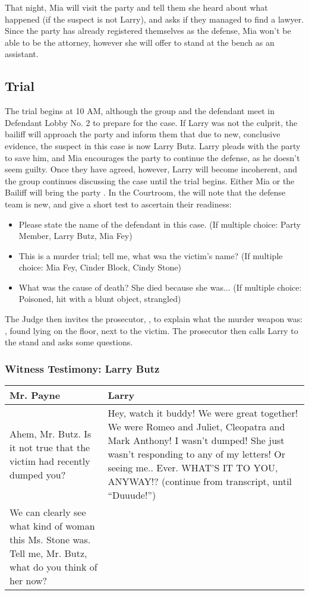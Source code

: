 That night, Mia will visit the party and tell them she heard about what happened (if the suspect is not Larry), and asks if they managed to find a lawyer. Since the party has already registered themselves as the defense, Mia won't be able to be the attorney, however she will offer to stand at the bench as an assistant. 

\subsection{Trial}
The trial begins at 10 AM, although the group and the defendant meet in Defendant Lobby No. 2 to prepare for the case. If Larry was not the culprit, the bailiff will approach the party and inform them that due to new, conclusive evidence, the suspect in this case is now Larry Butz. Larry pleads with the party to save him, and Mia encourages the party to continue the defense, as he doesn't seem guilty. Once they have agreed, however, Larry will become incoherent, and the group continues discussing the case until the trial begins. Either Mia or the Bailiff will bring the party . In the Courtroom, the  will note that the defense team is new, and give a short test to ascertain their readiness:
\begin{itemize}
\item Please state the name of the defendant in this case. (If multiple choice: Party Member, Larry Butz, Mia Fey)
\item This is a murder trial; tell me, what wsa the victim's name? (If multiple choice: Mia Fey, Cinder Block, Cindy Stone)
\item What was the cause of death? She died because she was... (If multiple choice: Poisoned, hit with a blunt object, strangled)
\end{itemize}

The Judge then invites the prosecutor, , to explain what the murder weapon was: , found lying on the floor, next to the victim. The prosecutor then calls Larry to the stand and asks some questions.

\subsubsection{Witness Testimony: Larry Butz}
\begin{center}
\begin{tabular}{p{2.5in} p{2.5in}}
Mr. Payne & Larry \\\hline
Ahem, Mr. Butz. Is it not true that the victim had recently dumped you? & Hey, watch it buddy! We were great together! We were Romeo and Juliet, Cleopatra and Mark Anthony! I wasn't dumped! She just wasn't responding to any of my letters! Or seeing me.. Ever. WHAT'S IT TO YOU, ANYWAY!? (continue from transcript, until ``Duuude!'')\\
We can clearly see what kind of woman this Ms. Stone was. Tell me, Mr. Butz, what do you think of her now? \\
\end{tabular}
\end{center}

